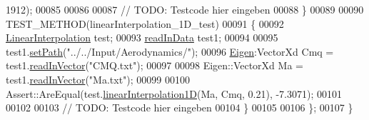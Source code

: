 \begin{DoxyCode}
      1912);
00085             
00086 
00087             \textcolor{comment}{// TODO: Testcode hier eingeben}
00088         \}
00089 
00090         TEST\_METHOD(linearInterpolation\_1D\_test)
00091         \{
00092             \hyperlink{class_linear_interpolation}{LinearInterpolation} test;
00093             \hyperlink{classread_in_data}{readInData} test1;
00094 
00095             test1.\hyperlink{classread_in_data_ad67d566fd837f6d721db279144d484e0}{setPath}(\textcolor{stringliteral}{"../../Input/Aerodynamics/"});
00096             \hyperlink{namespace_eigen}{Eigen}:VectorXd Cmq = test1.\hyperlink{classread_in_data_ab57aff38529234593d786ecace301cf7}{readInVector}(\textcolor{stringliteral}{"CMQ.txt"});
00097 
00098             Eigen::VectorXd Ma = test1.\hyperlink{classread_in_data_ab57aff38529234593d786ecace301cf7}{readInVector}(\textcolor{stringliteral}{"Ma.txt"});
00099 
00100             Assert::AreEqual(test.\hyperlink{class_linear_interpolation_aee1cf48d321cf6708470d9119fbf79e4}{linearInterpolation1D}(Ma, Cmq, 0.21), -7.3071);
00101 
00102 
00103             \textcolor{comment}{// TODO: Testcode hier eingeben}
00104         \}
00105 
00106     \};
00107 \}
\end{DoxyCode}
